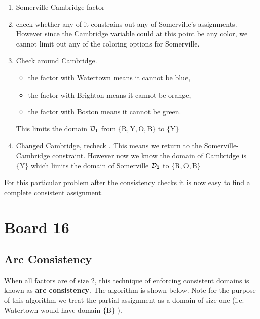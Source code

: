 \documentclass[10pt]{article}
\begin{document}
\begin{enumerate}
\item Somerville-Cambridge factor 
\item  check whether any of it constrains out any of Somerville's assignments. 
  However since the Cambridge variable could at this point be any 
  color, we cannot limit out any of the coloring options for Somerville.
\item Check around Cambridge. 
  \begin{itemize}
  \item    the factor with Watertown means it cannot be blue, 
  \item the factor with Brighton means it cannot be orange, 
  \item the factor with Boston means it cannot be green. 
  \end{itemize}
  This limits the domain $\mathcal{D}_1$ from $\{\mathrm{R,Y, O, B }\}$ to $\{\mathrm{Y}\}$

\item Changed Cambridge, recheck
  . This means we return
  to the Somerville-Cambridge constraint. However now we know the
  domain of Cambridge is $\{\mathrm{Y}\}$ which limits the domain of
  Somerville $\mathcal{D}_2$ to $\{\mathrm{R, O, B }\}$
\end{enumerate}

\noindent For this particular problem after the consistency checks it is now easy to find a complete consistent assignment. 

\section{Board 16}

\subsection{Arc Consistency}

When all factors are of size 2, this technique of enforcing consistent
domains is known as \textbf{arc consistency}. The algorithm is shown
below. Note for the purpose of this algorithm we treat the partial
assignment as a domain of size one (i.e. Watertown would have domain
$\{\mathrm{B}\}$ ).

\begin{algorithm}[h]

\begin{algorithmic}[1]

  \EndIf{}
  \EndFor{}
  \EndIf{}
  \EndFor{}
  \EndIf{}
  \EndWhile{}
  \EndProcedure{}
\end{algorithmic}
\end{algorithm}
\end{document}
